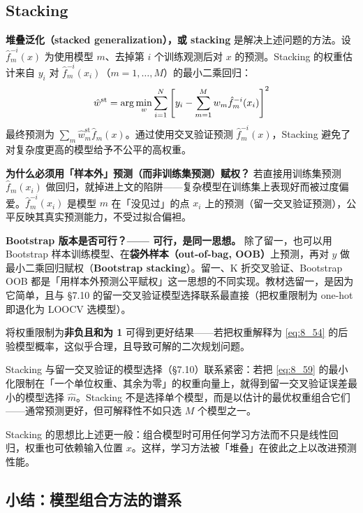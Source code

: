 \subsection{Stacking}

\textbf{堆叠泛化（stacked generalization），或 stacking} 是解决上述问题的方法。设 $\hat{f}_m^{-i}(x)$ 为使用模型 $m$、去掉第 $i$ 个训练观测后对 $x$ 的预测。Stacking 的权重估计来自 $y_i$ 对 $\hat{f}_m^{-i}(x_i)$（$m = 1, \ldots, M$）的最小二乘回归：
\begin{equation}\label{eq:8_59}
    \hat{w}^{\mathrm{st}} = \arg\min_w \sum_{i=1}^{N}\left[y_i - \sum_{m=1}^{M} w_m \hat{f}_m^{-i}(x_i)\right]^2
\end{equation}
最终预测为 $\sum_m \hat{w}_m^{\mathrm{st}}\hat{f}_m(x)$。通过使用交叉验证预测 $\hat{f}_m^{-i}(x)$，Stacking 避免了对复杂度更高的模型给予不公平的高权重。

\textbf{为什么必须用「样本外」预测（而非训练集预测）赋权？} 若直接用训练集预测 $\hat{f}_m(x_i)$ 做回归，就掉进上文的陷阱——复杂模型在训练集上表现好而被过度偏爱。$\hat{f}_m^{-i}(x_i)$ 是模型 $m$ 在「没见过」的点 $x_i$ 上的预测（留一交叉验证预测），公平反映其真实预测能力，不受过拟合偏袒。

\textbf{Bootstrap 版本是否可行？—— 可行，是同一思想。} 除了留一，也可以用 Bootstrap 样本训练模型、在\textbf{袋外样本（out-of-bag, OOB）}上预测，再对 $y$ 做最小二乘回归赋权（\textbf{Bootstrap stacking}）。留一、K 折交叉验证、Bootstrap OOB 都是「用样本外预测公平赋权」这一思想的不同实现。教材选留一，是因为它简单，且与 §7.10 的留一交叉验证模型选择联系最直接（把权重限制为 one-hot 即退化为 LOOCV 选模型）。

\begin{remark}
    将权重限制为\textbf{非负且和为 1} 可得到更好结果——若把权重解释为 \eqref{eq:8_54} 的后验模型概率，这似乎合理，且导致可解的二次规划问题。
\end{remark}

Stacking 与留一交叉验证的模型选择（§7.10）联系紧密：若把 \eqref{eq:8_59} 的最小化限制在「一个单位权重、其余为零」的权重向量上，就得到留一交叉验证误差最小的模型选择 $\hat{m}$。Stacking 不是选择单个模型，而是以估计的最优权重组合它们——通常预测更好，但可解释性不如只选 $M$ 个模型之一。

Stacking 的思想比上述更一般：组合模型时可用任何学习方法而不只是线性回归，权重也可依赖输入位置 $x$。这样，学习方法被「堆叠」在彼此之上以改进预测性能。

\subsection{小结：模型组合方法的谱系}

